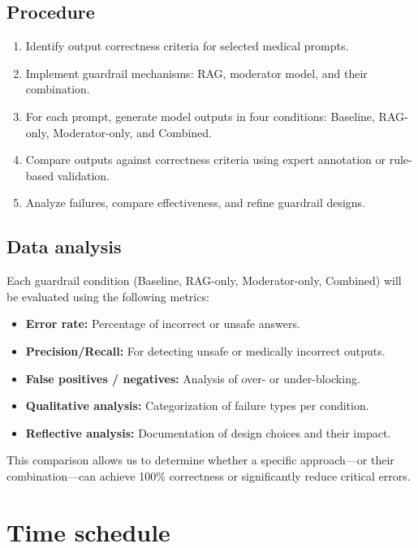 \documentclass[a4paper,doc,natbib]{apa6}
\begin{document}
    \subsection{Procedure}

    \begin{enumerate}
        \item Identify output correctness criteria for selected medical prompts.
        \item Implement guardrail mechanisms: RAG, moderator model, and their combination.
        \item For each prompt, generate model outputs in four conditions: Baseline, RAG-only, Moderator-only, and Combined.
        \item Compare outputs against correctness criteria using expert annotation or rule-based validation.
        \item Analyze failures, compare effectiveness, and refine guardrail designs.
    \end{enumerate}

    \subsection{Data analysis}

    Each guardrail condition (Baseline, RAG-only, Moderator-only, Combined) will be evaluated using the following metrics:

    \begin{itemize}
        \item \textbf{Error rate:} Percentage of incorrect or unsafe answers.
        \item \textbf{Precision/Recall:} For detecting unsafe or medically incorrect outputs.
        \item \textbf{False positives / negatives:} Analysis of over- or under-blocking.
        \item \textbf{Qualitative analysis:} Categorization of failure types per condition.
        \item \textbf{Reflective analysis:} Documentation of design choices and their impact.
    \end{itemize}

    This comparison allows us to determine whether a specific approach—or their combination—can achieve 100\% correctness or significantly reduce critical errors.

    \section{Time schedule}
\end{document}
